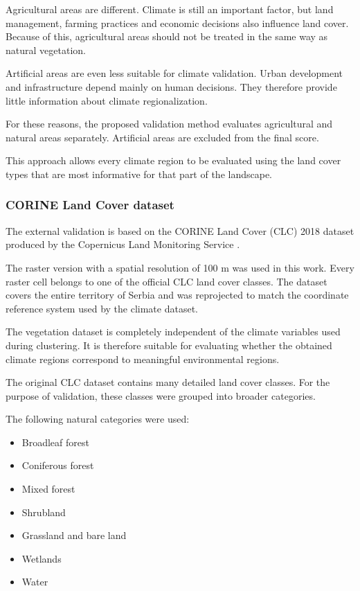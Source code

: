\documentclass[11pt]{article}
\begin{document}
Agricultural areas are different. Climate is still an important factor, but land management, farming practices and economic decisions also influence land cover. Because of this, agricultural areas should not be treated in the same way as natural vegetation.

Artificial areas are even less suitable for climate validation. Urban development and infrastructure depend mainly on human decisions. They therefore provide little information about climate regionalization.

For these reasons, the proposed validation method evaluates agricultural and natural areas separately. Artificial areas are excluded from the final score.

This approach allows every climate region to be evaluated using the land cover types that are most informative for that part of the landscape.


\subsubsection{CORINE Land Cover dataset}
The external validation is based on the CORINE Land Cover (CLC) 2018 dataset produced by the Copernicus Land Monitoring Service \cite{copernicusCLC2018,clcManual2021}.

The raster version with a spatial resolution of 100 m was used in this work. Every raster cell belongs to one of the official CLC land cover classes. The dataset covers the entire territory of Serbia and was reprojected to match the coordinate reference system used by the climate dataset.

The vegetation dataset is completely independent of the climate variables used during clustering. It is therefore suitable for evaluating whether the obtained climate regions correspond to meaningful environmental regions.

The original CLC dataset contains many detailed land cover classes. For the purpose of validation, these classes were grouped into broader categories.

The following natural categories were used:
\begin{itemize}
  \item Broadleaf forest
  \item Coniferous forest
  \item Mixed forest
  \item Shrubland
  \item Grassland and bare land
  \item Wetlands
  \item Water
\end{itemize}
\end{document}
